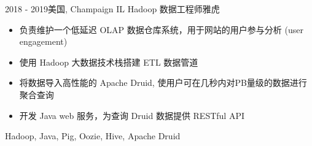 \begin{experiences}
\experience
{2018 - 2019}{美国, Champaign IL}
{Hadoop 数据工程师}{雅虎}
{
    \begin{itemize}
    \item 负责维护一个低延迟 OLAP 数据仓库系统，用于网站的用户参与分析 (user engagement)
    \item 使用 Hadoop 大数据技术栈搭建 ETL 数据管道
    \item 将数据导入高性能的 Apache Druid, 使用户可在几秒内对PB量级的数据进行聚合查询
    \item 开发 Java web 服务，为查询 Druid 数据提供 RESTful API
    \end{itemize}
}
{Hadoop, Java, Pig, Oozie, Hive, Apache Druid}

\end{experiences}